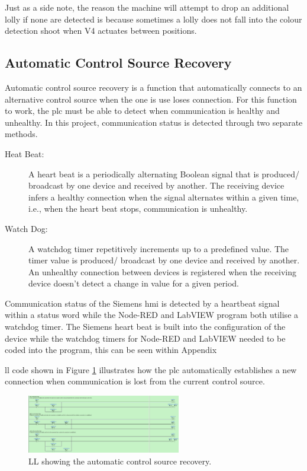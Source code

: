         Just as a side note, the reason the machine will attempt to drop an additional lolly if none are detected is because sometimes a lolly does not fall into the colour detection shoot when V4 actuates between positions. 

    \subsection{Automatic Control Source Recovery}
        Automatic control source recovery is a function that automatically connects to an alternative control source when the one is use loses connection. For this function to work, the \acrshort{plc} must be able to detect when communication is healthy and unhealthy. In this project, communication status is detected through two separate methods. 

        \begin{description}
            \item[Heat Beat:] A heart beat is a periodically alternating Boolean signal that is produced/ broadcast by one device and received by another. The receiving device infers a healthy connection when the signal alternates within a given time, i.e., when the heart beat stops, communication is unhealthy.   
            \item[Watch Dog:] A watchdog timer repetitively increments up to a predefined value. The timer value is produced/ broadcast by one device and received by another. An unhealthy connection between devices is registered when the receiving device doesn't detect a change in value for a given period.
        \end{description}

        Communication status of the Siemens \acrshort{hmi} is detected by a heartbeat signal within a status word while the Node-RED and LabVIEW program both utilise a watchdog timer. The Siemens heart beat is built into the configuration of the device while the watchdog timers for Node-RED and LabVIEW needed to be coded into the program, this can be seen within Appendix 

        \acrshort{ll} code shown in Figure \ref{fig:autoControlSourceRecovery} illustrates how the \acrshort{plc} automatically establishes a new connection when communication is lost from the current control source.  

        \begin{figure}[H]
            \centering
            \includegraphics[width = 0.6\textwidth]{2_images/autoControlSourceRecovery}
            \caption{LL showing the automatic control source recovery.}
            \label{fig:autoControlSourceRecovery}
        \end{figure}        

